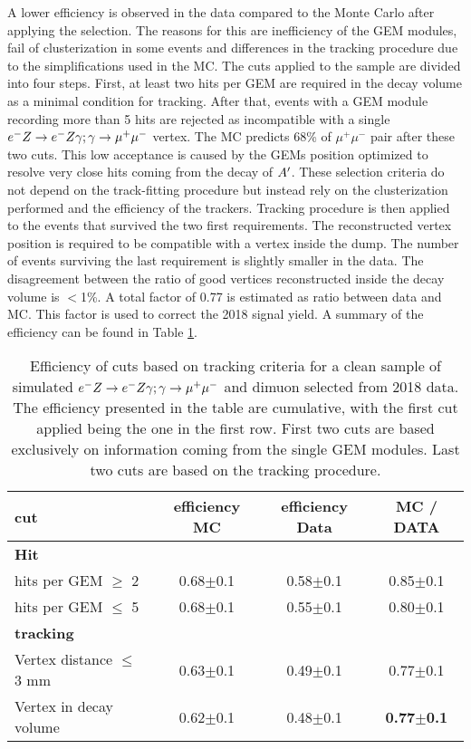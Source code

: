 A lower efficiency is observed in the data compared to the Monte Carlo after applying the selection. The reasons for this are inefficiency of the GEM modules, fail of clusterization in some events and differences in the tracking procedure due to the simplifications used in the MC. The cuts applied to the sample are divided into four steps. First, at least two hits per GEM are required in the decay volume as a minimal condition for tracking. After that, events with a GEM module recording more than 5 hits are rejected as incompatible with a single $e^- Z \to e^- Z \gamma; \gamma \to \mu^+ \mu^-$ vertex. The MC predicts 68\% of $\mu^+ \mu^-$ pair after these two cuts. This low acceptance is caused by the GEMs position optimized to resolve very close hits coming from the decay of $A'$. These selection criteria do not depend on the track-fitting procedure but instead rely on the clusterization performed and the efficiency of the trackers. Tracking procedure is then applied to the events that survived the two first requirements. The reconstructed vertex position is required to be compatible with a vertex inside the dump. The number of events surviving the last requirement  is slightly smaller in the data. The disagreement between the ratio of good vertices reconstructed inside the decay volume is $<$1\%. A total factor of 0.77 is estimated as ratio between data and MC. This factor is used to correct the 2018 signal yield. A summary of the efficiency can be found in Table \ref{tab:dimuon:efficiencies}.

\begin{center}
\begin{table}
  \begin{tabular}{|l|c|c|c|}
    \hline
    cut & efficiency MC & efficiency Data & MC / DATA \\
    \hline
    \textbf{Hit} & & &\\
    \hline
    hits per GEM $\geq$ 2 & 0.68$\pm$0.1 & 0.58$\pm$0.1 & 0.85$\pm$0.1 \\
    hits per GEM $\leq$ 5 & 0.68$\pm$0.1 & 0.55$\pm$0.1 & 0.80$\pm$0.1 \\
    \hline
    \textbf{tracking} & & &\\
    \hline
    Vertex distance $\leq$ 3 mm & 0.63$\pm$0.1 & 0.49$\pm$0.1 & 0.77$\pm$0.1  \\
    Vertex in decay volume & 0.62$\pm$0.1 & 0.48$\pm$0.1 & \textbf{0.77$\pm$0.1}\\
    \hline
    
  \end{tabular}
  \caption[MC/DATA for the tracking procedure and vertex reconstruction]{Efficiency of cuts based on tracking criteria for a clean sample of simulated $e^- Z \to e^- Z \gamma; \gamma \to \mu^+ \mu^-$ and dimuon selected from 2018 data. The efficiency presented in the table are cumulative, with the first cut applied being the one in the first row. First two cuts are based exclusively on information coming from the single GEM modules. Last two cuts are based on the tracking procedure.}
  \label{tab:dimuon:efficiencies}
\end{table}
\end{center}


